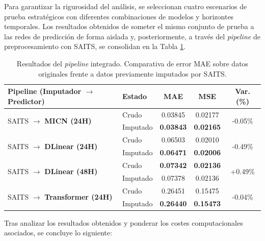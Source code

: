 Para garantizar la rigurosidad del análisis, se seleccionan cuatro escenarios de prueba estratégicos con diferentes combinaciones de modelos y horizontes temporales. Los resultados obtenidos de someter el mismo conjunto de prueba a las redes de predicción de forma aislada y, posteriormente, a través del \textit{pipeline} de preprocesamiento con SAITS, se consolidan en la Tabla \ref{tab:resultados_pipeline}.

\begin{table}[H]
	\centering
	\caption{Resultados del \textit{pipeline} integrado. Comparativa de error MAE sobre datos originales frente a datos previamente imputados por SAITS.}
	\label{tab:resultados_pipeline}
	\begin{tabular}{llccc}
		\toprule
		\textbf{Pipeline (Imputador $\rightarrow$ Predictor)} & \textbf{Estado} & \textbf{MAE} & \textbf{MSE} & \textbf{Var. (\%)} \\
		\midrule
		\multirow{2}{*}{SAITS $\rightarrow$ \textbf{MICN (24H)}} 
		& Crudo & 0.03845 & 0.02177 & \multirow{2}{*}{\textcolor{green!70!black}{-0.05\%}} \\
		& Imputado & \textbf{0.03843} & \textbf{0.02165} & \\
		\midrule
		\multirow{2}{*}{SAITS $\rightarrow$ \textbf{DLinear (24H)}} 
		& Crudo & 0.06503 & 0.02010 & \multirow{2}{*}{\textcolor{green!70!black}{-0.49\%}} \\
		& Imputado & \textbf{0.06471} & \textbf{0.02006} & \\
		\midrule
		\multirow{2}{*}{SAITS $\rightarrow$ \textbf{DLinear (48H)}} 
		& Crudo & \textbf{0.07342} & \textbf{0.02136} & \multirow{2}{*}{\textcolor{red!70!black}{+0.49\%}} \\
		& Imputado & 0.07378 & 0.02136 & \\
		\midrule
		\multirow{2}{*}{SAITS $\rightarrow$ \textbf{Transformer (24H)}} 
		& Crudo & 0.26451 & 0.15475 & \multirow{2}{*}{\textcolor{green!70!black}{-0.04\%}} \\
		& Imputado & \textbf{0.26440} & \textbf{0.15473} & \\
		\bottomrule
	\end{tabular}
\end{table}

Tras analizar los resultados obtenidos y ponderar los costes computacionales asociados, se concluye lo siguiente:


